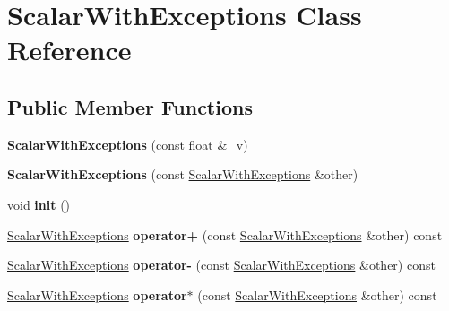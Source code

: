 \hypertarget{class_scalar_with_exceptions}{}\section{Scalar\+With\+Exceptions Class Reference}
\label{class_scalar_with_exceptions}
\subsection*{Public Member Functions}
\begin{DoxyCompactItemize}
\item 
\mbox{\label{class_scalar_with_exceptions_a7c89b3add704ac2ac549463961a7f3d2}} 
{\bfseries Scalar\+With\+Exceptions} (const float \&\+\_\+v)
\item 
\mbox{\label{class_scalar_with_exceptions_a674411859befe8639d1b679d41114f29}} 
{\bfseries Scalar\+With\+Exceptions} (const \hyperlink{class_scalar_with_exceptions}{Scalar\+With\+Exceptions} \&other)
\item 
\mbox{\label{class_scalar_with_exceptions_afa23d0c7616b5017d4793b27322a2fba}} 
void {\bfseries init} ()
\item 
\mbox{\label{class_scalar_with_exceptions_a8f18cff93c31ccfb85af389d24c00ea2}} 
\hyperlink{class_scalar_with_exceptions}{Scalar\+With\+Exceptions} {\bfseries operator+} (const \hyperlink{class_scalar_with_exceptions}{Scalar\+With\+Exceptions} \&other) const
\item 
\mbox{\label{class_scalar_with_exceptions_a4ab416e37710005a221039bbda1ec36c}} 
\hyperlink{class_scalar_with_exceptions}{Scalar\+With\+Exceptions} {\bfseries operator-\/} (const \hyperlink{class_scalar_with_exceptions}{Scalar\+With\+Exceptions} \&other) const
\item 
\mbox{\label{class_scalar_with_exceptions_a13ae655fb9164eb3151d8a31908ff281}} 
\hyperlink{class_scalar_with_exceptions}{Scalar\+With\+Exceptions} {\bfseries operator$\ast$} (const \hyperlink{class_scalar_with_exceptions}{Scalar\+With\+Exceptions} \&other) const
\item 

\end{DoxyCompactItemize}
